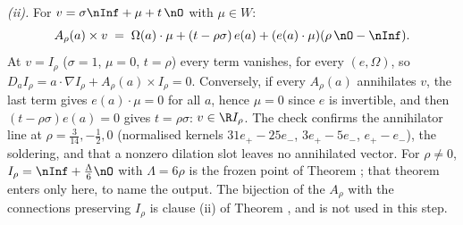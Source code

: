 \emph{(ii).} For $v = \sigma\nInf + \mu + t\,\nO$ with $\mu \in W$:
\[
A_{\rho}(a) \times v \;=\; \Omega(a) \cdot \mu + (t - \rho\sigma)\, e(a) + (e(a) \cdot \mu)(\rho\,\nO - \nInf).
\]
At $v = I_{\rho}$ ($\sigma = 1$, $\mu = 0$, $t = \rho$) every term vanishes, for every $(e, \Omega)$, so $D_{a} I_{\rho} = a \cdot \nabla I_{\rho} + A_{\rho}(a) \times I_{\rho} = 0$. Conversely, if every $A_{\rho}(a)$ annihilates $v$, the last term gives $e(a) \cdot \mu = 0$ for all $a$, hence $\mu = 0$ since $e$ is invertible, and then $(t - \rho\sigma)e(a) = 0$ gives $t = \rho\sigma$: $v \in \R I_{\rho}$. The check confirms the annihilator line at $\rho = \tfrac{3}{14}, -\tfrac12, 0$ (normalised kernels $31e_{+} - 25e_{-}$, $3e_{+} - 5e_{-}$, $e_{+} - e_{-}$), the soldering, and that a nonzero dilation slot leaves no annihilated vector. For $\rho \neq 0$, $I_{\rho} = \nInf + \tfrac{\Lambda}{6}\nO$ with $\Lambda = 6\rho$ is the frozen point of Theorem ; that theorem enters only here, to name the output. The bijection of the $A_{\rho}$ with the connections preserving $I_{\rho}$ is clause (ii) of Theorem , and is not used in this step.


